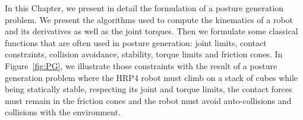 

In this Chapter, we present in detail the formulation of a posture generation problem.
We present the algorithms used to compute the kinematics of a robot and its derivatives as well as the joint torques.
Then we formulate some classical functions that are often used in posture generation: joint limits, contact constraints, collision avoidance, stability, torque limits and friction cones.
In Figure~\ref{fig:PG}, we illustrate those constraints with the result of a posture generation problem where the HRP4 robot must climb on a stack of cubes while being statically stable, respecting its joint and torque limits, the contact forces must remain in the friction cones and the robot must avoid auto-collisions and collisions with the environment.


